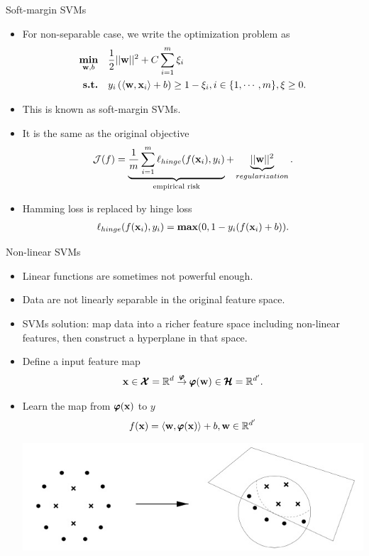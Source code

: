 \documentclass[first=dgreen,second=purple,logo=yellowexc]{aaltoslides}
\begin{document}
{\begin{frame}{Soft-margin SVMs}
	\begin{itemize}
		\item For non-separable case, we write the optimization problem as
		\begin{align*}
			\underset{\mathbf {w},b}{\textbf{min}} &\quad \frac{1}{2} ||\mathbf {w}||^2 + C\sum_{i=1}^m\xi_i\\
            \textbf{s.t.} &\quad y_i\,(\langle \mathbf {w}, \mathbf {x}_i \rangle + b) \ge 1-\xi_i, i\in\{1,\cdots,m\}, \xi\ge0.
		\end{align*}
		\item This is known as soft-margin SVMs.
		\item It is the same as the original objective
		\begin{align*}
			\mathcal{J}(f) = \underbrace{\frac{1}{m}\sum_{i=1}^{m}\ell_{hinge}(f(\mathbf {x}_i),y_i)}_{\text{empirical risk}} + \underbrace{||\mathbf {w}||^2}_{regularization}.
		\end{align*}
		\item Hamming loss is replaced by hinge loss
		\begin{align*}
			\ell_{hinge}(f(\mathbf {x}_i),y_i) = \textbf{max}(0, 1-y_i(f(\mathbf {x}_i)+b)).
		\end{align*}
	\end{itemize}
\end{frame}

\begin{frame}{Non-linear SVMs}
	\begin{itemize}
		\item Linear functions are sometimes not powerful enough.
		\item Data are not linearly separable in the original feature space.
		\item SVMs solution: map data into a richer feature space including non-linear features, then construct a hyperplane in that space.
		\item Define a input feature map
		\begin{align*}
			\mathbf {x}\in\pmb {\mathcal{X}}=\mathbb{R}^d\overset{\pmb \varphi}{\rightarrow}\pmb \varphi(\mathbf {w})\in\pmb {\mathcal{H}} =\mathbb{R}^{d'}.
		\end{align*}
		\item Learn the map from $\pmb \varphi(\mathbf {x})$ to $y$
		\begin{align*}
			f(\mathbf {x}) = \langle \mathbf {w}, \pmb \varphi(\mathbf {x}) \rangle + b, \mathbf {w}\in\mathbb{R}^{d'}
		\end{align*}
		\begin{center}
			\includegraphics[scale=0.3]{./figures/nonlinearsvm.jpg}
		\end{center}
	\end{itemize}
\end{frame}


}
\end{document}
